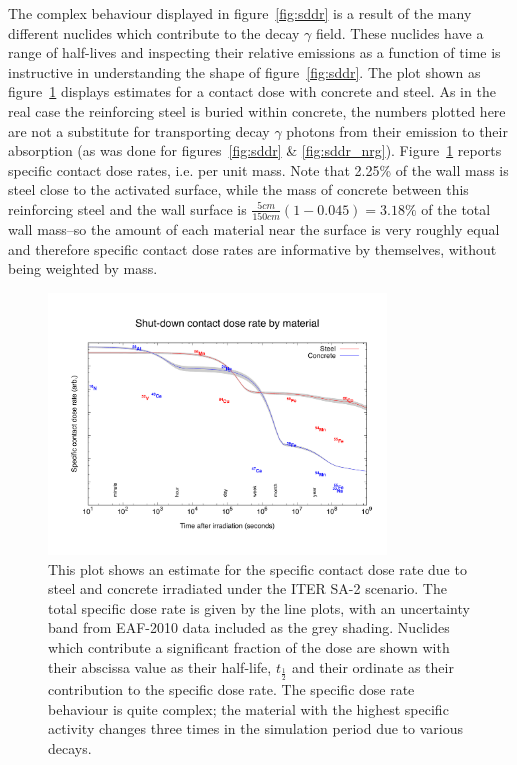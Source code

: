 The complex behaviour displayed in figure~\ref{fig:sddr} is a result of the many different nuclides which contribute to the decay $\gamma$ field. These nuclides have a range of half-lives and inspecting their relative emissions as a function of time is instructive in understanding the shape of figure~\ref{fig:sddr}. The plot shown as figure~\ref{fig:contact_dose} displays estimates for a contact dose with concrete and steel. As in the real case the reinforcing steel is buried within concrete, the numbers plotted here are not a substitute for transporting decay $\gamma$ photons from their emission to their absorption (as was done for figures~\ref{fig:sddr} \& \ref{fig:sddr_nrg}). Figure~\ref{fig:contact_dose} reports specific contact dose rates, i.e. per unit mass. Note that 2.25\% of the wall mass is steel close to the activated surface, while the mass of concrete between this reinforcing steel and the wall surface is $\frac{5cm}{150cm} (1 - 0.045) = 3.18\%$ of the total wall mass--so the amount of each material near the surface is very roughly equal and therefore specific contact dose rates are informative by themselves, without being weighted by mass.

\begin{figure}[H]
  \centering
  \includegraphics[width=0.8\textwidth]{contact_dose_by_mat}
  \caption{This plot shows an estimate for the specific contact dose rate due to steel and concrete irradiated under the ITER SA-2 scenario. The total specific dose rate is given by the line plots, with an uncertainty band from EAF-2010 data included as the grey shading. Nuclides which contribute a significant fraction of the dose are shown with their abscissa value as their half-life, $t_{\frac{1}{2}}$ and their ordinate as their contribution to the specific dose rate. The specific dose rate behaviour is quite complex; the material with the highest specific activity changes three times in the simulation period due to various decays.}
  \label{fig:contact_dose}
\end{figure}

